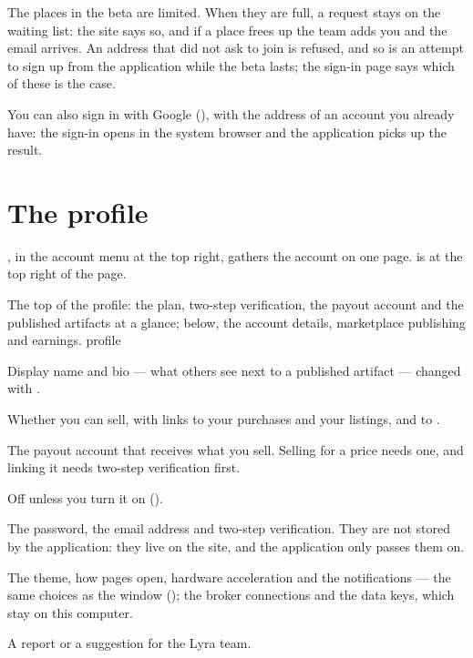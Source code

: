 \noindent
The places in the beta are limited. When they are full, a request stays on
the waiting list: the site says so, and if a place frees up the team adds you
and the email arrives. An address that did not ask to join is refused, and so is an
attempt to sign up from the application while the beta lasts; the sign-in
page says which of these is the case.

\noindent
You can also sign in with Google (), with the
address of an account you already have: the sign-in opens in the system
browser and the application picks up the result.

\section{The profile}\label{sez:profile}

, in the account menu at the top right, gathers the account on
one page.  is at the top right of the page.

  {The top of the profile: the plan, two-step verification, the payout account
   and the published artifacts at a glance; below, the account details,
   marketplace publishing and earnings.}
  {profile}

\begin{description}[leftmargin = 1.4em, style = nextline, itemsep = 4pt]
  \item[\voce{Account details}] Display name and bio --- what others see next
    to a published artifact --- changed with .
  \item[\voce{Marketplace publishing}] Whether you can sell, with links to
    your purchases and your listings, and to .
  \item[\voce{Marketplace earnings}] The payout account that receives what
    you sell. Selling for a price needs one, and linking it needs two-step
    verification first.
  \item[\voce{Automatic publishing}] Off unless you turn it on
    ().
  \item[\voce{Security}] The password, the email address and two-step
    verification. They are not stored by the application: they live on the
    site, and the application only passes them on.
  \item[\voce{Preferences}, \voce{Brokers and data keys}] The theme, how
    pages open, hardware acceleration and the notifications --- the same
    choices as the  window (); the broker
    connections and the data keys, which stay on this computer.
  \item[\voce{Send us feedback}] A report or a suggestion for the Lyra
    team.
\end{description}

